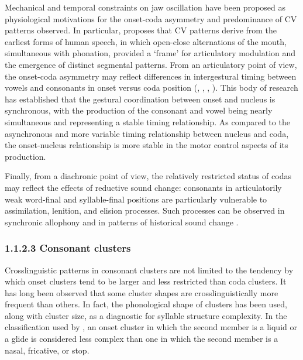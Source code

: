   Mechanical and temporal constraints on jaw oscillation have been proposed as physiological motivations for the onset-coda asymmetry and predominance of CV patterns observed. In particular, \citet{MacNeilage1998} proposes that CV patterns derive from the earliest forms of human speech, in which open-close alternations of the mouth, simultaneous with phonation, provided a ‘frame’ for articulatory modulation and the emergence of distinct segmental patterns. From an articulatory point of view, the onset-coda asymmetry may reflect differences in intergestural timing between vowels and consonants in onset versus coda position (\citealt{Byrd1996a}, \citealt{BrowmanGoldstein1995}, \citealt{GickEtAl2006}, \citealt{MarinPouplier2010}). This body of research has established that the gestural coordination between onset and nucleus is synchronous, with the production of the consonant and vowel being nearly simultaneous and representing a stable timing relationship. As compared to the asynchronous and more variable timing relationship between nucleus and coda, the onset-nucleus relationship is more stable in the motor control aspects of its production.



  Finally, from a diachronic point of view, the relatively restricted status of codas may reflect the effects of reductive sound change: consonants in articulatorily weak word-final and syllable-final positions are particularly vulnerable to assimilation, lenition, and elision processes. Such processes can be observed in synchronic allophony and in patterns of historical sound change \citep{Bybee2015b}.


\subsubsection{\textbf{1.1.2.3} \textbf{Consonant} \textbf{clusters}}

  Crosslinguistic patterns in consonant clusters are not limited to the tendency by which onset clusters tend to be larger and less restricted than coda clusters. It has long been observed that some cluster shapes are crosslinguistically more frequent than others. In fact, the phonological shape of clusters has been used, along with cluster size, as a diagnostic for syllable structure complexity. In the classification used by \citet{Maddieson2013a}, an onset cluster in which the second member is a liquid or a glide is considered less complex than one in which the second member is a nasal, fricative, or stop.



